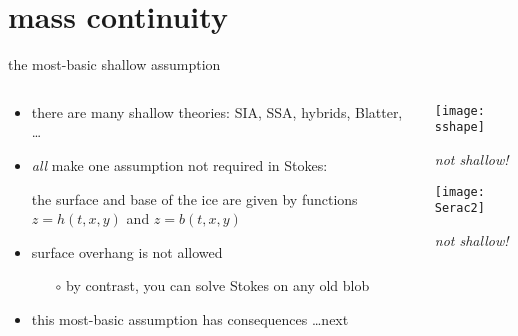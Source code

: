 
\section{mass continuity}

\begin{frame}{the most-basic shallow assumption}

\begin{columns}

\begin{column}{0.6\textwidth}
\begin{itemize}
\item there are many shallow theories: SIA, SSA, hybrids, Blatter, \dots \nocite{Blatter}
\item \emph{all} make one assumption not required in Stokes:

\begin{center}
\alert{the surface and base of the ice are given by functions $z=h(t,x,y)$ and $z=b(t,x,y)$}
\end{center}
\item surface overhang is not allowed
  \begin{itemize}
  \item[$\circ$] by contrast, you can solve Stokes on any old blob
  \end{itemize}
\item this most-basic assumption has consequences \dots next
\end{itemize}
\end{column}

\begin{column}{0.4\textwidth}
\texttt{[image: sshape]}

\scriptsize
\begin{center}
\emph{not shallow!}
\end{center}
\vspace{6mm}

\texttt{[image: Serac2]}

\begin{center}
\emph{not shallow!}
\end{center}
\end{column}
\end{columns}
\end{frame}


